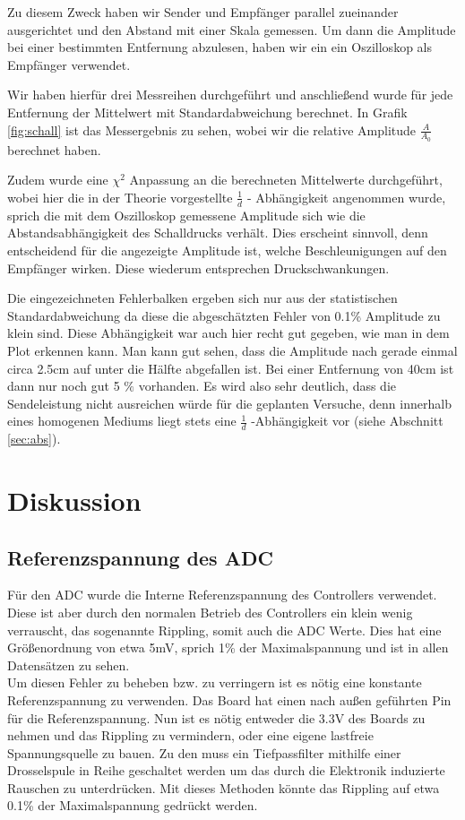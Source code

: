 \documentclass[12pt,a4paper,titlepage,headinclude,bibtotoc]{scrartcl}
\numberwithin{equation}{subsection}
\begin{document}
Zu diesem Zweck haben wir Sender und Empfänger parallel zueinander ausgerichtet und den Abstand mit einer Skala gemessen. Um dann die Amplitude bei einer bestimmten Entfernung abzulesen, haben wir ein
ein Oszilloskop als Empfänger verwendet.

Wir haben hierfür drei Messreihen durchgeführt und anschließend wurde für jede Entfernung der Mittelwert mit Standardabweichung berechnet. In Grafik \ref{fig:schall} ist das Messergebnis zu sehen, wobei wir die relative Amplitude $\frac{A}{A_0}$ berechnet haben.

Zudem wurde eine $\chi^2$ Anpassung an die berechneten Mittelwerte durchgeführt, wobei hier die in der Theorie vorgestellte $\frac{1}{d}$ - Abhängigkeit angenommen wurde, sprich die mit dem Oszilloskop gemessene Amplitude sich wie die Abstandsabhängigkeit des Schalldrucks verhält.
Dies erscheint sinnvoll, denn entscheidend für die angezeigte Amplitude ist, welche Beschleunigungen auf den Empfänger wirken.
Diese wiederum entsprechen Druckschwankungen.

Die eingezeichneten Fehlerbalken ergeben sich nur aus der statistischen Standardabweichung da diese die abgeschätzten Fehler von 0.1\% Amplitude zu klein sind. Diese Abhängigkeit war auch hier recht gut gegeben, wie man in dem Plot erkennen kann. 
Man kann gut sehen, dass die Amplitude nach gerade einmal circa 2.5\si{\centi\meter} auf unter die Hälfte abgefallen ist. Bei einer Entfernung von 40\si{\centi\meter} ist dann nur noch gut 5 $\%$ vorhanden. Es wird also sehr deutlich, dass die Sendeleistung nicht ausreichen würde für die geplanten Versuche, denn innerhalb eines homogenen Mediums liegt stets eine $\frac{1}{d}$ -Abhängigkeit vor (siehe Abschnitt \ref{sec:abs}). 


\section{Diskussion}
\label{sec:diskussion}

\subsection{Referenzspannung des ADC}
\label{sec:diskreffADC}
Für den ADC wurde die Interne Referenzspannung des Controllers verwendet.
Diese ist aber durch den normalen Betrieb des Controllers ein klein wenig verrauscht, das sogenannte Rippling, somit auch die ADC Werte.
Dies hat eine Größenordnung von etwa 5\si{\milli\volt}, sprich 1\% der Maximalspannung und ist in allen Datensätzen zu sehen.\\
Um diesen Fehler zu beheben bzw. zu verringern ist es nötig eine konstante Referenzspannung zu verwenden.
Das Board hat einen nach außen geführten Pin für die Referenzspannung.
Nun ist es nötig entweder die 3.3\si{\volt} des Boards zu nehmen und das Rippling zu vermindern, oder eine eigene lastfreie Spannungsquelle zu bauen.
Zu den muss ein Tiefpassfilter mithilfe einer Drosselspule in Reihe geschaltet werden um das durch die Elektronik induzierte Rauschen zu unterdrücken.
Mit dieses Methoden könnte das Rippling auf etwa 0.1\% der Maximalspannung gedrückt werden.
\end{document}
